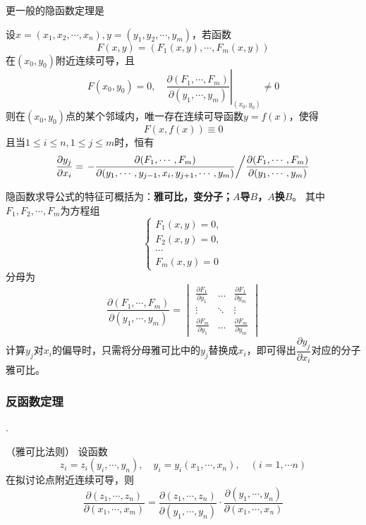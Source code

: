 更一般的隐函数定理是
\begin{theorem}
    设$x=(x_1,x_2,\cdots,x_n),y=(y_1,y_2,\cdots,y_m)$，若函数
    \[ F(x,y) = (F_1(x,y),\cdots,F_m(x,y)) \]
    在$(x_0,y_0)$附近连续可导，且
    \[ F(x_0,y_0) = 0, \quad\left.\frac{\partial(F_1,\cdots,F_m)}{\partial(y_1,\cdots,y_m)}\right|_{(x_0,y_0)} \neq 0 \]
    则在$(x_0,y_0)$点的某个邻域内，唯一存在连续可导函数$y=f(x)$，使得
    \[ F(x,f(x))\equiv 0 \]
    且当$1\leq i \leq n, 1\leq j\leq m$时，恒有
    \[
        \frac{\partial y_j}{\partial x_i}
        =
        \left.
        - \frac{\partial(F_1,\cdots,F_m)}{\partial(y_1,\cdots,y_{j-1},x_i,y_{j+1},\cdots,y_m)}
        \middle/
        \frac{\partial(F_1,\cdots,F_m)}{\partial(y_1,\cdots,y_m)}
        \right.
    \]
\end{theorem}

隐函数求导公式的特征可概括为：\textbf{\textsf{雅可比，变分子；$A$导$B$，$A$换$B$}}。
其中$F_1,F_2,\cdots,F_m$为方程组
\[
    \begin{cases}
        F_1(x,y) = 0, \\
        F_2(x,y) = 0, \\
        \cdots        \\
        F_m(x,y) = 0
    \end{cases}
\]
分母为
\begin{equation}
    \frac{\partial(F_1,\cdots,F_m)}{\partial(y_1,\cdots,y_m)}
    =
    \begin{vmatrix}
        \frac{\partial F_1}{\partial y_1} & \dots  & \frac{\partial F_1}{\partial y_m} \\
        \vdots                            & \ddots & \vdots                            \\
        \frac{\partial F_m}{\partial y_1} & \dots  & \frac{\partial F_m}{\partial y_m}
    \end{vmatrix}
\end{equation}
计算$y_j$对$x_i$的偏导时，只需将分母雅可比中的$y_j$替换成$x_i$，即可得出$\dfrac{\partial y_j}{\partial x_i}$对应的分子雅可比。

\subsubsection{反函数定理}
.
\begin{theorem}
    （雅可比法则）
    \label{th:雅可比法则}
    设函数
    \[ z_i = z_i(y_i,\cdots,y_n),\quad y_i=y_i(x_1,\cdots,x_n),\quad (i=1,\cdots n) \]
    在拟讨论点附近连续可导，则
    \[
        \frac{\partial(z_1,\cdots,z_n)}{\partial(x_1,\cdots,x_m)}
        = \frac{\partial(z_1,\cdots,z_n)}{\partial(y_1,\cdots,y_n)} \cdot \frac{\partial(y_1,\cdots,y_n)}{\partial(x_1,\cdots,x_n)}
    \]
\end{theorem}

